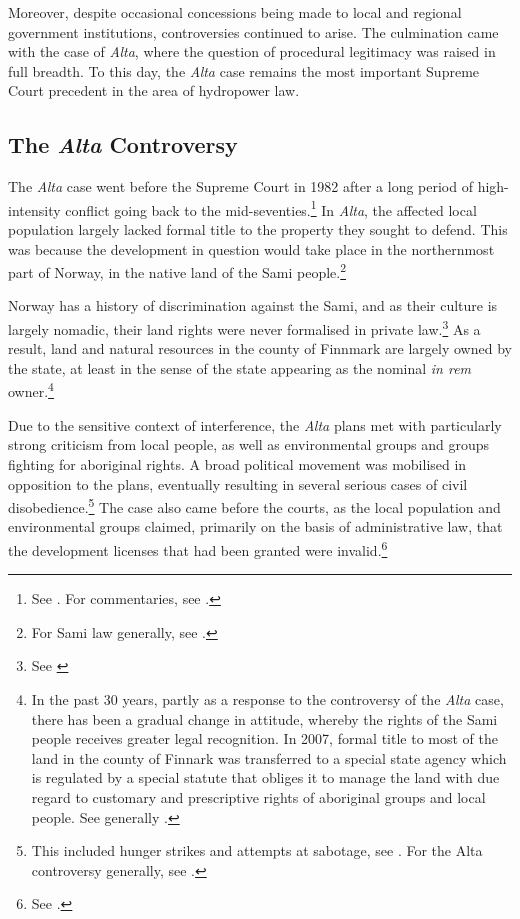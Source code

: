 Moreover, despite occasional concessions being made to local and regional government institutions, controversies continued to arise. The culmination came with the case of {\it Alta}, where the question of procedural legitimacy was raised in full breadth. To this day, the {\it Alta} case remains the most important Supreme Court precedent in the area of hydropower law.

\subsection{The {\it Alta} Controversy}\label{sec:5:4:3}

The {\it Alta} case went before the Supreme Court in 1982 after a long period of high-intensity conflict going back to the mid-seventies.\footnote{See \cite{alta82}. For commentaries, see \cite{eckhoff82,boe83,hagvar88}.} In {\it Alta}, the affected local population largely lacked formal title to the property they sought to defend. This was because the development in question would take place in the northernmost part of Norway, in the native land of the Sami people.\footnote{For Sami law generally, see \cite{skogvang02}.}

Norway has a history of discrimination against the Sami, and as their culture is largely nomadic, their land rights were never formalised in private law.\footnote{See \cite[149-156]{ravna12s}} As a result, land and natural resources in the county of Finnmark are largely owned by the state, at least in the sense of the state appearing as the nominal {\it in rem} owner.\footnote{In the past 30 years, partly as a response to the controversy of the {\it Alta} case, there has been a gradual change in attitude, whereby the rights of the Sami people receives greater legal recognition. In 2007, formal title to most of the land in the county of Finnark was transferred to a special state agency which is regulated by a special statute that obliges it to manage the land with due regard to customary and prescriptive rights of aboriginal groups and local people. See generally \cite{bull07}.}

Due to the sensitive context of interference, the {\it Alta} plans met with particularly strong criticism from local people, as well as environmental groups and groups fighting for aboriginal rights. A broad political movement was mobilised in opposition to the plans, eventually resulting in several serious cases of civil disobedience.\footnote{This included hunger strikes and attempts at sabotage, see \cite[80-83]{nilsen08}. For the Alta controversy generally, see \cite{altawiki,hjorthol06}.} The case also came before the courts, as the local population and environmental groups claimed, primarily on the basis of administrative law, that the development licenses that had been granted were invalid.\footnote{See \cite{eckhoff82}.}

